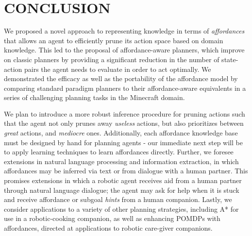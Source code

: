 \documentclass[]{article}
\begin{document}
\section{CONCLUSION}

We proposed a novel approach to representing knowledge in terms of
{\em affordances}~\citep{gibson77} that allows an agent to efficiently
prune its action space based on domain knowledge. This led to the 
proposal of affordance-aware planners, which improve on classic planners
by providing a significant reduction in the number of state-action pairs the
agent needs to evaluate in order to act optimally. We demonstrated the efficacy 
as well as the portability of the affordance model by comparing standard paradigm
planners to their affordance-aware equivalents in a series of challenging planning tasks in the Minecraft
domain.

We plan to introduce a more robust inference procedure for pruning actions such that
the agent not only prunes away {\it useless} actions, but also prioritizes between
{\it great} actions, and {\it mediocre} ones. Additionally, each affordance knowledge base
must be designed by hand for planning agents - our immediate next step will be to
apply learning techniques to learn affordances directly.
Further, we foresee extensions in natural language processing and information
extraction, in which affordances may be inferred via text or from dialogue with a human partner.
This promises extensions in which a robotic agent receives aid from a human partner through natural language
dialogue; the agent may ask for help when it is stuck and
receive affordance or subgoal {\it hints} from a human companion. Lastly, we consider applications to a variety of other planning
strategies, including A* for use in a robotic-cooking companion, as well as enhancing POMDPs with affordances, directed at applications to robotic care-giver companions.

{\small

  
}
\end{document}
